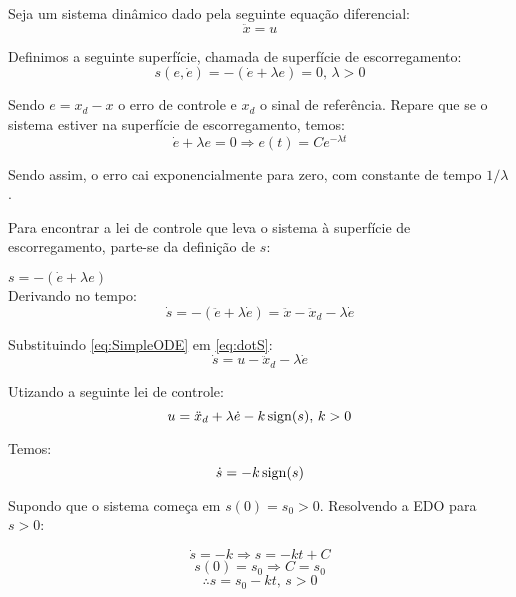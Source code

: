 Seja um sistema din\^amico dado pela seguinte equa\c{c}\~ao diferencial:
\begin{equation} \label{eq:SimpleODE}
\ddot{x} = u
\end{equation}

Definimos a seguinte superf\'icie, chamada de superf\'icie de escorregamento:
\begin{equation} \label{eq:SlidingSurface}
s(e, \dot{e}) = - (\dot{e} + \lambda e) = 0, \, \lambda > 0
\end{equation}

Sendo $e = x_d - x$ o erro de controle e $x_d$ o sinal de refer\^encia. Repare que se o sistema estiver na superf\'icie de escorregamento, temos:
\begin{equation} \label{eq:SlidingError}
\dot{e} + \lambda e = 0 \Rightarrow e(t) = C e^{- \lambda t}
\end{equation}

Sendo assim, o erro cai exponencialmente para zero, com constante de tempo $1/\lambda$.

Para encontrar a lei de controle que leva o sistema \`a superf\'icie de escorregamento, parte-se da defini\c{c}\~ao de $s$:

$ s = -(\dot{e} + \lambda e) $ \\

Derivando no tempo:
\begin{equation} \label{eq:dotS}
\dot{s} =  -(\ddot{e} + \lambda \dot{e}) = \ddot{x} - \ddot{x}_d - \lambda \dot{e} 
\end{equation}

Substituindo \eqref{eq:SimpleODE} em \eqref{eq:dotS}:
\begin{equation} \label{dotS2}
\dot{s} = u - \ddot{x}_d - \lambda \dot{e}
\end{equation}

Utizando a seguinte lei de controle:
\begin{equation} \label{SMControlLaw1D}
u = \ddot{x}_d + \lambda \dot{e} - k \operatorname*{sign} (s), \, k>0
\end{equation}

Temos:
\begin{equation} \label{CloserLoop1D}
\dot{s} = -k \operatorname*{sign}(s) 
\end{equation}

Supondo que o sistema come\c{c}a em $s(0) = s_0 >0$. Resolvendo a EDO para $s>0$:

$$ \dot{s} = -k \Rightarrow s = -k t + C $$
$$ s(0) = s_0 \Rightarrow C = s_0 $$
$$ \therefore s = s_0 - k t, \, s>0 $$

